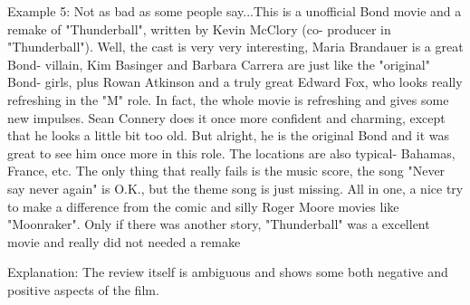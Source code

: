 \begin{simplechar}
Example 5:
Not as bad as some people say...This is a unofficial Bond movie and a remake of "Thunderball", written by Kevin McClory (co- producer in "Thunderball"). Well, the cast is very very interesting, Maria Brandauer is a great Bond- villain, Kim Basinger and Barbara Carrera are just like the "original" Bond- girls, plus Rowan Atkinson and a truly great Edward Fox, who looks really refreshing in the "M" role. In fact, the whole movie is refreshing and gives some new impulses. Sean Connery does it once more confident and charming, except that he looks a little bit too old. But alright, he is the original Bond and it was great to see him once more in this role. The locations are also typical- Bahamas, France, etc. The only thing that really fails is the music score, the song "Never say never again" is O.K., but the theme song is just missing. All in one, a nice try to make a difference from the comic and silly Roger Moore movies like "Moonraker". Only if there was another story, "Thunderball" was a excellent movie and really did not needed a remake

Explanation:
The review itself is ambiguous and shows some both negative and positive aspects of the film.

\end{simplechar}